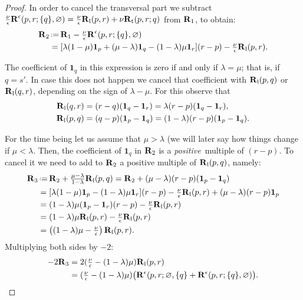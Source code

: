 \documentclass{amsart}
\theoremstyle{definition}
\renewcommand{\b}[1]{{\boldsymbol{#1}}} %
\newcommand{\one}{\mathbf{1}} %
\newcommand{\eqdef}{\mbox{\,\raisebox{0.2ex}{\scriptsize\ensuremath{\mathrm:}}\ensuremath{=}\,}} %
\newcommand{\Rvector}{\b{\rm R}} %
\newcommand{\lon}{\operatorname{l}} %
\newcommand{\trans}{\operatorname{t}} %
\newcommand{\Rlong}{\Rvector_{\lon}} %
\newcommand{\Rtrans}{\Rvector_{\trans}} %
\newcommand{\Reps}{\Rvector^\epsilon} %
\begin{document}
\begin{proof}
In order to cancel the transversal part we subtract $\tfrac{\nu}{\epsilon} \Reps(p,r;\{q\},\varnothing) =
\tfrac{\nu}{\epsilon} \Rlong(p,r) +  {\nu} \Rtrans(p,r;q)$ from $\Rvector_1$, to obtain:
\begin{align*}
\Rvector_2 & \eqdef \Rvector_1 - \tfrac{\nu}{\epsilon} \Reps(p,r;\{q\},\varnothing) \\
& = [\lambda (1-\mu)  \one_p   + (\mu - \lambda) \one_q  - (1-\lambda) \mu \one_r](r-p) - \tfrac{\nu}{\epsilon} \Rlong(p,r).
\end{align*}

The coefficient of $\one_q$ in this expression is zero if and only if $\lambda=\mu$; that is, if $q=s'$. In case this does not happen we cancel that coefficient with $\Rlong(p,q)$ or $\Rlong(q,r)$, depending on the sign of $\lambda - \mu$. For this observe that
\begin{align*}
\Rlong(q,r) & = (r-q)(\one_q-\one_r) =  \lambda (r -p)(\one_q-\one_r),\\
\Rlong(p,q) & = (q-p)(\one_p-\one_q) = (1-\lambda) (r -p)(\one_p-\one_q).
\end{align*}

For the time being 
let us assume that $\mu > \lambda$ (we will later say how things change if $\mu < \lambda$. Then, the coefficient of $\one_q$ in $\Rvector_2$ is a \emph{positive} multiple of $(r-p)$. To cancel it we need to add to $\Rvector_2$ a positive multiple of $\Rlong(p,q)$, namely:
\begin{align*}
\Rvector_3 & \eqdef \Rvector_2 + \tfrac{\mu-\lambda}{1-\lambda} \Rlong(p,q) 
	 =\Rvector_2 + (\mu-\lambda)(r -p)(\one_p-\one_q)\\
& = [\lambda (1-\mu)  \one_p   - (1-\lambda) \mu \one_r](r-p) - \tfrac{\nu}{\epsilon} \Rlong(p,r) + (\mu-\lambda)(r -p) \one_p \\
& = (1-\lambda) \mu (\one_p   - \one_r)(r-p) - \tfrac{\nu}{\epsilon} \Rlong(p,r) \\
& = (1-\lambda) \mu \Rlong(p,r) - \tfrac{\nu}{\epsilon} \Rlong(p,r) \\
& = \left( (1-\lambda) \mu - \tfrac{\nu}{\epsilon} \right)\Rlong(p,r).
\end{align*}
Multiplying both sides by $-2$:
\begin{align*}
- 2 \Rvector_3 
& = 2(\tfrac{\nu}{\epsilon} -  (1-\lambda) \mu )  \Rlong(p,r) \\
& = ( \tfrac{\nu}{\epsilon} -   (1-\lambda) \mu ) \big(\Reps(p,r; \varnothing,\{q\} + \Reps(p,r; \{q\}, \varnothing)\big). 
\end{align*}


\end{proof}
\end{document}
